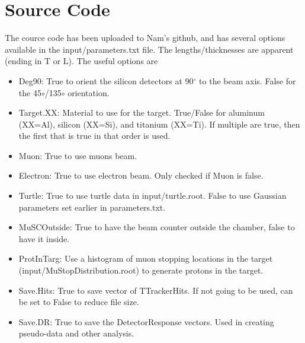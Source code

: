 \documentclass[a4paper]{article}
\begin{document}
\section{Source Code}

The cource code has been uploaded to Nam's github, and has several options available in
the input/parameters.txt file. The lengths/thicknesses are apparent (ending in T or L).
The useful options are

\begin{itemize}
\item Deg90:
  True to orient the silicon detectors at 90$^{\circ}$ to the
  beam axis. False for the 45${\circ}$/135${\circ}$ orientation.
\item Target.XX:
  Material to use for the target. True/False for aluminum (XX=Al),
  silicon (XX=Si), and titanium (XX=Ti). If multiple
  are true, then the first that is true in that order is used.
\item Muon:
  True to use muons beam.
\item Electron:
  True to use electron beam. Only checked if Muon is false.
\item Turtle:
  True to use turtle data in input/turtle.root. False to use Gaussian
  parameters set earlier in parameters.txt.
\item MuSCOutside:
  True to have the beam counter outside the chamber, false to have it inside.
\item ProtInTarg:
  Use a histogram of muon stopping locations in the target (input/MuStopDistribution.root)
  to generate protons in the target.
\item Save.Hits:
  True to save vector of TTrackerHits. If not going to be used, can be set to False
  to reduce file size.
\item Save.DR:
  True to save the DetectorResponse vectors. Used in creating pseudo-data and other analysis.
\end{itemize}
\end{document}
